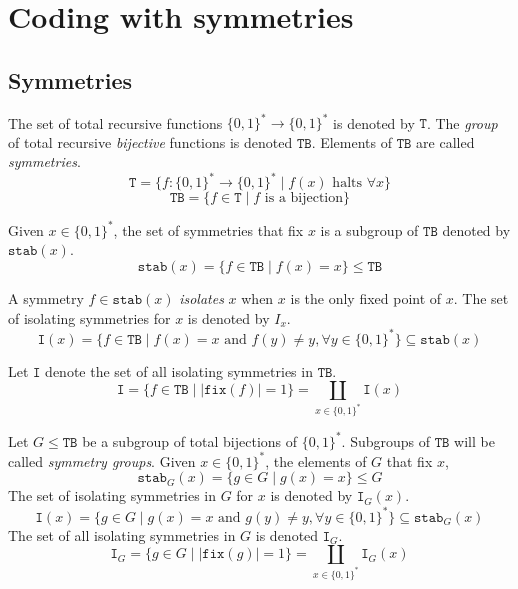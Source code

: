\documentclass{article}
\newcommand{\bin}{\{0,1\}^*} %
\newcommand{\T}{\mathtt{T}}
\newcommand{\TB}{\mathtt{TB}}
\newcommand{\st}{\mathtt{stab}}
\newcommand{\I}{\mathtt{I}}
\newcommand{\fix}{\mathtt{fix}}
\begin{document}
\section{Coding with symmetries}

\subsection{Symmetries}

The set of total recursive functions $\bin \to \bin$ is denoted by $\T$. The \emph{group} of total recursive \emph{bijective} functions is denoted $\TB$. Elements of $\TB$ are called \emph{symmetries}.
\begin{equation}
    \T = \{ f : \bin \to \bin \mid f(x) \text{ halts } \forall x \}
\end{equation}
\begin{equation}
    \TB = \{ f \in \T \mid f \text{ is a bijection} \}
\end{equation}

Given $x \in \bin$, the set of symmetries that fix $x$ is a subgroup of $\TB$ denoted by $\st(x)$.
\begin{equation}
    \st(x) = \{f \in \TB \mid f(x) = x\} \leq \TB
\end{equation}

A symmetry $f \in \st(x)$ \emph{isolates} $x$ when $x$ is the only fixed point of $x$. The set of isolating symmetries for $x$ is denoted by $I_x$.
\begin{equation}
    \I(x) = \{ f \in \TB \mid f(x) = x \text{ and } f(y) \neq y,  \forall y \in \bin \} \subseteq \st(x)
\end{equation}

Let $\I$ denote the set of all isolating symmetries in $\TB$. 
\begin{equation}
    \I = \{ f \in \TB \mid |\fix(f)| = 1 \} = \coprod_{x \in \bin} \I(x)
\end{equation}

Let $G \leq \TB$ be a subgroup of total bijections of $\bin$. Subgroups of $\TB$ will be called \emph{symmetry groups}. Given $x \in \bin$, the elements of $G$ that fix $x$,
\begin{equation}
    \st_G(x) = \{g \in G \mid g(x) = x \} \leq G 
\end{equation}
The set of isolating symmetries in $G$ for $x$ is denoted by $\I_G(x)$.
\begin{equation}
        \I(x) = \{ g \in G \mid g(x) = x \text{ and } g(y) \neq y,  \forall y \in \bin \} \subseteq \st_G(x)
\end{equation}
The set of all isolating symmetries in $G$ is denoted $\I_G$.
\begin{equation}
    \I_G = \{ g \in G \mid |\fix(g)| = 1 \} = \coprod_{x \in \bin} \I_G(x)
\end{equation}
\end{document}
